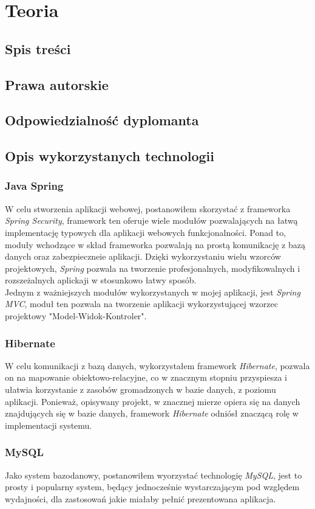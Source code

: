 \documentclass[a4paper, titlepage]{article}
\begin{document}
	\section{\textbf{Teoria}}
	\subsection{Spis treści}
	\subsection{Prawa autorskie}
	\subsection{Odpowiedzialność dyplomanta}
	\subsection{Opis wykorzystanych technologii}
	\subsubsection{Java Spring}
	W celu stworzenia aplikacji webowej, postanowiłem skorzystać z frameworka \textit{Spring Security}, framework ten oferuje wiele modułów pozwalających na łatwą implementację typowych dla aplikacji webowych funkcjonalności. Ponad to, moduły wchodzące w skład frameworka pozwalają na prostą komunikację z bazą danych oraz zabezpieczneie aplikacji. Dzięki wykorzystaniu wielu wzorców projektowych, \textit{Spring} pozwala na tworzenie profesjonalnych, modyfikowalnych i rozszeżalnych aplickaji w stosunkowo łatwy sposób.
	\\Jednym z ważniejszych modułów wykorzystanych w mojej aplikacji, jest \textit{Spring MVC}, moduł ten pozwala na tworzenie aplikacji wykorzystującej wzorzec projektowy "Model-Widok-Kontroler".
	\subsubsection{Hibernate}
	W celu komunikacji z bazą danych, wykorzystałem framework \textit{Hibernate}, pozwala on na mapowanie obiektowo-relacyjne, co w znacznym stopniu przyspiesza i ułatwia korzystanie z zasobów gromadzonych w bazie danych, z poziomu aplikacji. Ponieważ, opisywany projekt, w znacznej mierze opiera się na danych znajdujących się w bazie danych, framework \textit{Hibernate} odniósł znaczącą rolę w implementacji systemu. 
	\subsubsection{MySQL}
	Jako system bazodanowy, postanowiłem wyorzystać technologię \textit{MySQL}, jest to prosty i popularny system, będący jednocześnie wystarczającym pod względem wydajności, dla zastosowań jakie miałaby pełnić prezentowana aplikacja.
\end{document}
